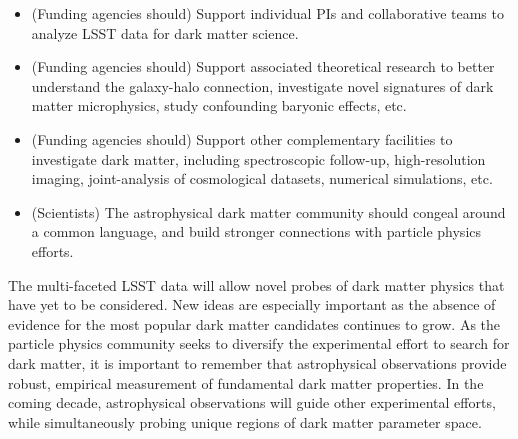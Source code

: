 \documentclass[12pt]{article}
\begin{document}
\begin{itemize}[noitemsep]

    \item (Funding agencies should) Support individual PIs and collaborative teams to analyze LSST data for dark matter science. %
    \item (Funding agencies should) Support associated theoretical research to better understand the galaxy-halo connection, investigate novel signatures of dark matter microphysics, study confounding baryonic effects, etc.
    
    \item (Funding agencies should) Support other complementary facilities to investigate dark matter, including spectroscopic follow-up, high-resolution imaging, joint-analysis of cosmological datasets, numerical simulations, etc.

    \item (Scientists) The astrophysical dark matter community should congeal around a common language, and build  stronger connections with particle physics efforts.
    
    
    
\end{itemize}

\noindent The multi-faceted LSST data will allow novel probes of dark matter physics that have yet to be considered.
New ideas are especially important as the absence of evidence for the most popular dark matter candidates continues to grow.
As the particle physics community seeks to diversify the experimental effort to search for dark matter, it is important to remember that astrophysical observations provide robust, empirical measurement of fundamental dark matter properties.
In the coming decade, astrophysical observations will guide other experimental efforts, while simultaneously probing unique regions of dark matter parameter space.
\end{document}
